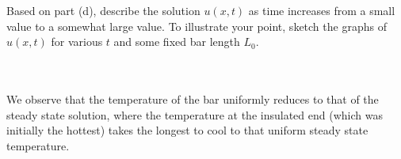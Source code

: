 Based on part (d), describe the solution $u(x, t)$ as time increases from a small value to a somewhat large value.
To illustrate your point, sketch the graphs of $u(x, t)$ for various $t$ and some fixed bar length $L_0$.

\begin{solution}\ \\\\
    We observe that the temperature of the bar uniformly reduces to that of the steady state solution, where the 
    temperature at the insulated end (which was initially the hottest) takes the longest to cool to that uniform steady 
    state temperature.
    \ \\
\end{solution}
